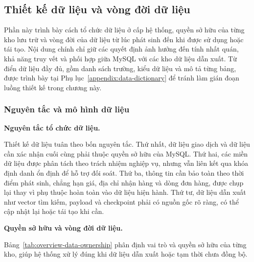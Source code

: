
\subsection{Thiết kế dữ liệu và vòng đời dữ liệu}

Phần này trình bày cách tổ chức dữ liệu ở cấp hệ thống, quyền sở hữu của từng
kho lưu trữ và vòng đời của dữ liệu từ lúc phát sinh đến khi được sử dụng hoặc
tái tạo. Nội dung chính chỉ giữ các quyết định ảnh hưởng đến tính nhất quán,
khả năng truy vết và phối hợp giữa MySQL với các kho dữ liệu dẫn xuất. Từ điển
dữ liệu đầy đủ, gồm danh sách trường, kiểu dữ liệu và mô tả từng bảng, được
trình bày tại Phụ lục~\ref{appendix:data-dictionary} để tránh làm gián đoạn
luồng thiết kế trong chương này.

\subsubsection{Nguyên tắc và mô hình dữ liệu}

\textbf{Nguyên tắc tổ chức dữ liệu.}

Thiết kế dữ liệu tuân theo bốn nguyên tắc. Thứ nhất, dữ liệu giao dịch và dữ
liệu cần xác nhận cuối cùng phải thuộc quyền sở hữu của MySQL. Thứ hai, các
miền dữ liệu được phân tách theo trách nhiệm nghiệp vụ, nhưng vẫn liên kết qua
khóa định danh ổn định để hỗ trợ đối soát. Thứ ba, thông tin cần bảo toàn theo
thời điểm phát sinh, chẳng hạn giá, địa chỉ nhận hàng và dòng đơn hàng, được
chụp lại thay vì phụ thuộc hoàn toàn vào dữ liệu hiện hành. Thứ tư, dữ liệu
dẫn xuất như vector tìm kiếm, payload và checkpoint phải có nguồn gốc rõ ràng,
có thể cập nhật lại hoặc tái tạo khi cần.

\textbf{Quyền sở hữu và vòng đời dữ liệu.}

Bảng~\ref{tab:overview-data-ownership} phân định vai trò và quyền sở hữu của từng
kho, giúp hệ thống xử lý đúng khi dữ liệu dẫn xuất hoặc tạm thời chưa đồng bộ.

